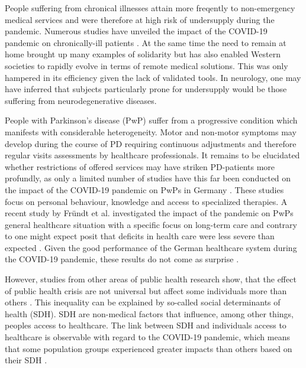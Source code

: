 \documentclass{bmcart}
\begin{document}
People suffering from chronical illnesses attain more freqently to non-emergency medical services and were therefore at high risk of undersupply during the pandemic. Numerous studies have unveiled the impact of the COVID-19 pandemic on chronically-ill patients \cite{olivieri2021auswirkungen, ceglaeinfluss}. At the same time the need to remain at home brought up many examples of solidarity but has also enabled Western societies to rapidly evolve in terms of remote medical solutions. This was only hampered in its efficiency given the lack of validated tools. In neurology, one may have inferred that subjects particularly prone for undersupply would be those suffering from neurodegenerative diseases. 

People with Parkinson's disease (PwP) suffer from a progressive condition which manifests with considerable heterogeneity. Motor and non-motor symptoms may develop during the course of PD requiring continuous adjustments and therefore regular visits assessments by healthcare professionals. It remains to be elucidated whether restrictions of offered services may have striken PD-patients more profundly, as only a limited number of studies have this far been conducted on the impact of the COVID-19 pandemic on PwPs in Germany \cite{zipprich2020knowledge, frundt2022impact, richter2021analysis}. These studies focus on personal behaviour, knowledge and access to specialized therapies. A recent study by Fründt et al. investigated the impact of the pandemic on PwPs general healthcare situation with a specific focus on long-term care \cite{frundt2022impact} and contrary to one might expect posit that deficits in health care were less severe than expected \cite{frundt2022impact}. Given the good performance of the German healthcare system during the COVID-19 pandemic, these results do not come as surprise \cite{10665-341674}. %
	
	However, studies from other areas of public health research show, that the effect of public health crisis are not universal but affect some individuals more than others \cite{huijts2017prevalence, lowcock2012social}. This inequality can be explained by so-called  social determinants of health (SDH). SDH are non-medical factors that influence, among other things, peoples access to healthcare. The link between SDH and individuals access to healthcare is observable with regard to the COVID-19 pandemic, which means that some population groups experienced greater impacts than others based on their SDH \cite{whocovidbrief}.
	
\end{document}
